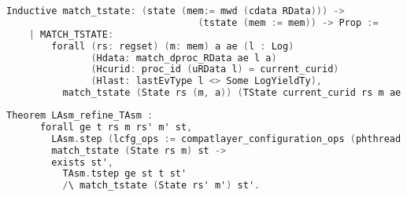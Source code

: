 
\begin{lstlisting}[language=C]
    Inductive match_tstate: (state (mem:= mwd (cdata RData))) -> 
                                  (tstate (mem := mem)) -> Prop :=
    | MATCH_TSTATE:
        forall (rs: regset) (m: mem) a ae (l : Log)
               (Hdata: match_dproc_RData ae l a)
               (Hcurid: proc_id (uRData l) = current_curid)
               (Hlast: lastEvType l <> Some LogYieldTy),
          match_tstate (State rs (m, a)) (TState current_curid rs m ae l).
\end{lstlisting}

\begin{lstlisting}[language=C]
    Theorem LAsm_refine_TAsm :
      forall ge t rs m rs' m' st, 
        LAsm.step (lcfg_ops := compatlayer_configuration_ops (phthread <@$\oplus$@> L64)) ge (State rs m) t (State rs' m') ->
        match_tstate (State rs m) st ->
        exists st',        
          TAsm.tstep ge st t st'
          /\ match_tstate (State rs' m') st'.
\end{lstlisting}
